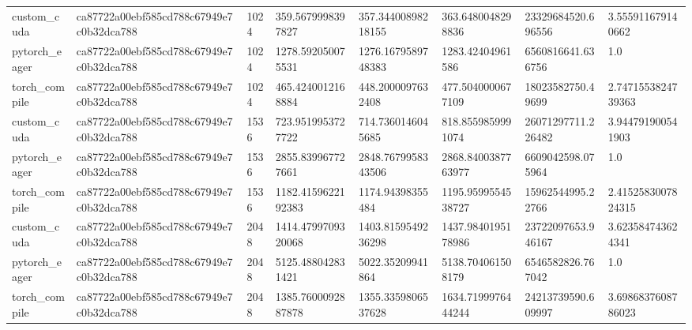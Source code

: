 \begin{tabular}{llllllll}
custom\_cuda & ca87722a00ebf585cd788c67949e7c0b32dca788 & 1024 & 359.5679998397827 & 357.34400898218155 & 363.6480048298836 & 23329684520.696556 & 3.555911679140662 \\
pytorch\_eager & ca87722a00ebf585cd788c67949e7c0b32dca788 & 1024 & 1278.592050075531 & 1276.1679589748383 & 1283.42404961586 & 6560816641.636756 & 1.0 \\
torch\_compile & ca87722a00ebf585cd788c67949e7c0b32dca788 & 1024 & 465.4240012168884 & 448.2000097632408 & 477.5040000677109 & 18023582750.49699 & 2.7471553824739363 \\
custom\_cuda & ca87722a00ebf585cd788c67949e7c0b32dca788 & 1536 & 723.9519953727722 & 714.7360146045685 & 818.8559859991074 & 26071297711.226482 & 3.944791900541903 \\
pytorch\_eager & ca87722a00ebf585cd788c67949e7c0b32dca788 & 1536 & 2855.839967727661 & 2848.7679958343506 & 2868.8400387763977 & 6609042598.075964 & 1.0 \\
torch\_compile & ca87722a00ebf585cd788c67949e7c0b32dca788 & 1536 & 1182.4159622192383 & 1174.94398355484 & 1195.9599554538727 & 15962544995.22766 & 2.4152583007824315 \\
custom\_cuda & ca87722a00ebf585cd788c67949e7c0b32dca788 & 2048 & 1414.4799709320068 & 1403.8159549236298 & 1437.9840195178986 & 23722097653.946167 & 3.623584743624341 \\
pytorch\_eager & ca87722a00ebf585cd788c67949e7c0b32dca788 & 2048 & 5125.488042831421 & 5022.35209941864 & 5138.704061508179 & 6546582826.767042 & 1.0 \\
torch\_compile & ca87722a00ebf585cd788c67949e7c0b32dca788 & 2048 & 1385.7600092887878 & 1355.3359806537628 & 1634.7199976444244 & 24213739590.609997 & 3.6986837608786023 \\
\hline
\end{tabular}
